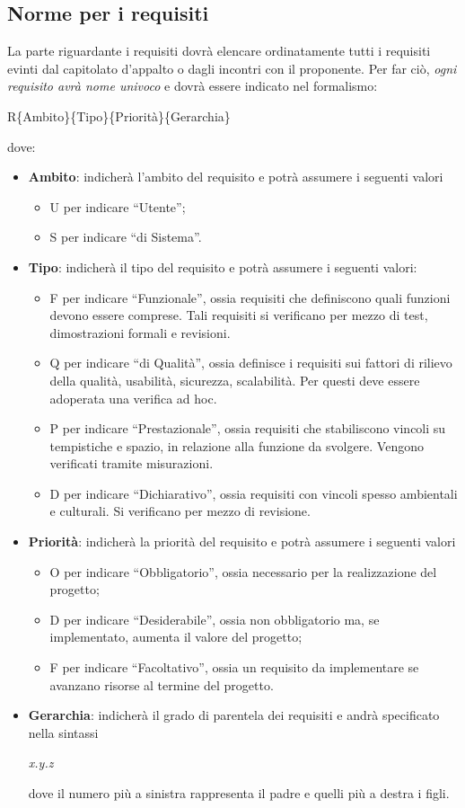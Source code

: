 \subsection{Norme per i requisiti}
La parte riguardante i requisiti dovrà elencare ordinatamente tutti i requisiti evinti dal capitolato d'appalto o dagli incontri con il proponente. Per far ciò, \textit{ogni requisito avrà nome univoco} e dovrà essere indicato nel formalismo:
\begin{center}
R\{Ambito\}\{Tipo\}\{Priorità\}\{Gerarchia\}
\end{center}
dove:
\begin{itemize}
\item \textbf{Ambito}: indicherà l'ambito del requisito e potrà assumere i seguenti valori
\begin{itemize}
\item U per indicare ``Utente'';
\item S per indicare ``di Sistema''.
\end{itemize}
\item \textbf{Tipo}: indicherà il tipo del requisito e potrà assumere i seguenti valori:
\begin{itemize}
\item F per indicare ``Funzionale'', ossia requisiti che definiscono quali funzioni devono essere comprese. Tali requisiti si verificano per mezzo di test, dimostrazioni formali e revisioni.
\item Q per indicare ``di Qualità'', ossia definisce i requisiti sui fattori di rilievo della qualità, usabilità, sicurezza, scalabilità. Per questi deve essere adoperata una verifica ad hoc.
\item P per indicare ``Prestazionale'', ossia requisiti che stabiliscono vincoli su tempistiche e spazio, in relazione alla funzione da svolgere. Vengono verificati tramite misurazioni.
\item D per indicare ``Dichiarativo'', ossia requisiti con vincoli spesso ambientali e culturali. Si verificano per mezzo di revisione.

\end{itemize}
\item \textbf{Priorità}: indicherà la priorità del requisito e potrà assumere i seguenti valori
\begin{itemize}
\item O per indicare ``Obbligatorio'', ossia necessario per la realizzazione del progetto;
\item D per indicare ``Desiderabile'', ossia non obbligatorio ma, se implementato, aumenta il valore del progetto;
\item F per indicare ``Facoltativo'', ossia un requisito da implementare se avanzano risorse al termine del progetto.
\end{itemize}
\item \textbf{Gerarchia}: indicherà il grado di parentela dei requisiti e andrà specificato nella sintassi
\begin{center}
\textit{x.y.z}
\end{center}
dove il numero più a sinistra rappresenta il padre e quelli più a destra i figli.
\end{itemize}
